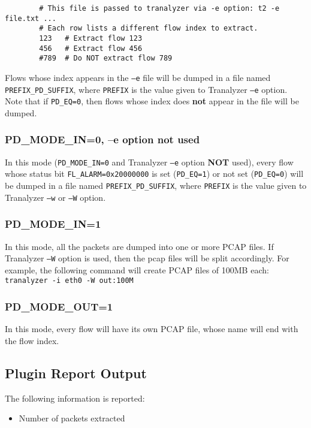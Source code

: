 \documentclass[documentation]{subfiles}
\begin{document}
\begin{verbatim}
        # This file is passed to tranalyzer via -e option: t2 -e file.txt ...
        # Each row lists a different flow index to extract.
        123   # Extract flow 123
        456   # Extract flow 456
        #789  # Do NOT extract flow 789
\end{verbatim}

Flows whose index appears in the {\tt --e} file will be dumped in a file named {\tt PREFIX\_PD\_SUFFIX}, where {\tt PREFIX} is the value given to Tranalyzer {\tt --e} option.
Note that if {\tt PD\_EQ=0}, then flows whose index does {\bf not} appear in the file will be dumped.

\subsubsection{PD\_MODE\_IN=0, --e option not used}\label{pcapdalarm}
In this mode ({\tt PD\_MODE\_IN=0} and Tranalyzer {\tt --e} option {\bf NOT} used), every flow whose status bit {\tt FL\_ALARM=0x20000000} is set ({\tt PD\_EQ=1}) or not set ({\tt PD\_EQ=0}) will be dumped in a file named {\tt PREFIX\_PD\_SUFFIX}, where {\tt PREFIX} is the value given to Tranalyzer {\tt --w} or {\tt --W} option.

\subsubsection{PD\_MODE\_IN=1}\label{pcapdall}
In this mode, all the packets are dumped into one or more PCAP files. If Tranalyzer {\tt --W} option is used, then the pcap files will be split accordingly. For example, the following command will create PCAP files of 100MB each: {\tt tranalyzer -i eth0 -W out:100M}

\subsubsection{PD\_MODE\_OUT=1}\label{pcapdoneperflow}
In this mode, every flow will have its own PCAP file, whose name will end with the flow index.

\subsection{Plugin Report Output}
The following information is reported:
\begin{itemize}
    \item Number of packets extracted
\end{itemize}
\end{document}
